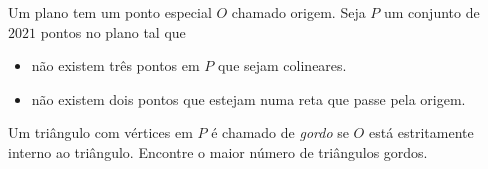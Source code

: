 Um plano tem um ponto especial $O$ chamado origem. Seja $P$ um conjunto de $2021$ pontos no plano tal que
\begin{itemize}
	\item não existem três pontos em $P$ que sejam colineares.
	\item não existem dois pontos que estejam numa reta que passe pela origem.
\end{itemize}
Um triângulo com vértices em $P$ é chamado de \emph{gordo} se $O$ está estritamente interno ao triângulo.
Encontre o maior número de triângulos gordos.
